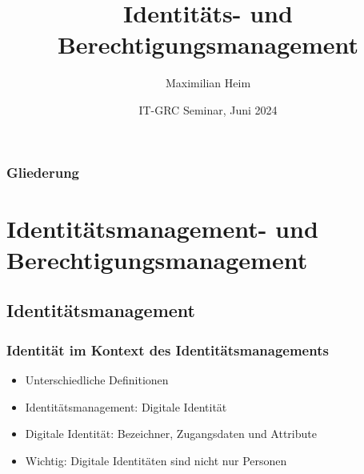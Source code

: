 \documentclass[11pt]{beamer}
\author{Maximilian Heim\inst{1}}
\institute[HS-AS]
{
  \inst{1}
  Hochschule Albstadt-Sigmaringen
}
\title{Identitäts- und Berechtigungsmanagement}
\date[IT-GRC 2024]{IT-GRC Seminar, Juni 2024}
\begin{document}
\frame{\titlepage}
\begin{frame}
  \frametitle{Gliederung}
  \tableofcontents
\end{frame}
\section{Identitätsmanagement- und Berechtigungsmanagement}
\subsection{Identitätsmanagement}
\begin{frame}
  \frametitle{Identität im Kontext des Identitätsmanagements}
  \begin{itemize}
    \item Unterschiedliche Definitionen
    \item Identitätsmanagement: Digitale Identität
    \item Digitale Identität: Bezeichner, Zugangsdaten und Attribute
    \item Wichtig: Digitale Identitäten sind nicht nur Personen
  \end{itemize}
\end{frame}
\end{document}
